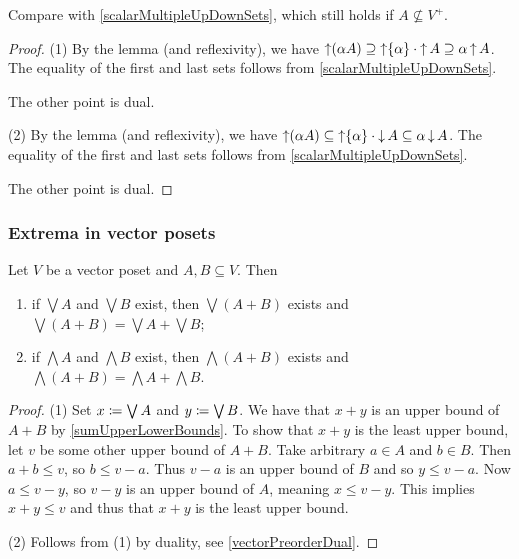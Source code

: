 Compare with \ref{scalarMultipleUpDownSets}, which still holds if $A \nsubseteq V^+$.
\begin{proof}
(1) By the lemma (and reflexivity), we have $\operatorname{\uparrow}(\alpha A) \supseteq \operatorname{\uparrow}\{\alpha\}\cdot \operatorname{\uparrow} A \supseteq \alpha \operatorname{\uparrow} A$. The equality of the first and last sets follows from \ref{scalarMultipleUpDownSets}.

The other point is dual.

(2) By the lemma (and reflexivity), we have $\operatorname{\uparrow}(\alpha A) \subseteq \operatorname{\uparrow}\{\alpha\}\cdot \operatorname{\downarrow} A \subseteq \alpha \operatorname{\downarrow} A$. The equality of the first and last sets follows from \ref{scalarMultipleUpDownSets}.

The other point is dual.
\end{proof}


\subsubsection{Extrema in vector posets}
\begin{lemma} \label{extremaVectorSum}
Let $V$ be a vector poset and $A,B\subseteq V$. Then
\begin{enumerate}
\item if $\bigvee A$ and $\bigvee B$ exist, then $\bigvee(A+B)$ exists and $\bigvee(A+B) = \bigvee A + \bigvee B$;
\item if $\bigwedge A$ and $\bigwedge B$ exist, then $\bigwedge(A+B)$ exists and $\bigwedge(A+B) = \bigwedge A + \bigwedge B$.
\end{enumerate}
\end{lemma}
\begin{proof}
(1) Set $x \coloneqq \bigvee A$ and $y \coloneqq \bigvee B$. We have that $x+y$ is an upper bound of $A+B$ by \ref{sumUpperLowerBounds}. To show that $x+y$ is the least upper bound, let $v$ be some other upper bound of $A+B$. Take arbitrary $a\in A$ and $b\in B$. Then $a+b \leq v$, so $b\leq v-a$. Thus $v-a$ is an upper bound of $B$ and so $y \leq v-a$. Now $a\leq v-y$, so $v-y$ is an upper bound of $A$, meaning $x \leq v-y$. This implies $x+y \leq v$ and thus that $x+y$ is the least upper bound.

(2) Follows from (1) by duality, see \ref{vectorPreorderDual}.
\end{proof}

